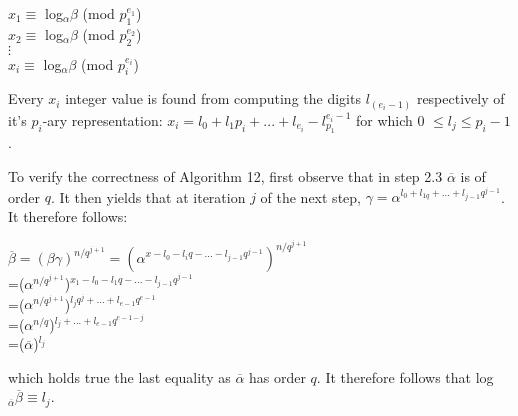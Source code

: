 \documentclass[iwp,first]{luthesis}
\begin{document}
\begin{center}
$x_1 \equiv$ log$_{\alpha}\beta$ (mod $p_{1}^{e_1}$)
\\
$x_2 \equiv$ log$_{\alpha}\beta$ (mod $p_{2}^{e_2}$)
\\
$\vdots$
\\
$x_i \equiv$ log$_{\alpha}\beta$ (mod $p_{i}^{e_i}$)
\end{center}

Every $x_i$ integer value is found from computing the digits $l_(e_{i}-1)$ respectively of it's $p_{i}$-ary representation: $x_{i} = l_{0} + l_{1}p_{i}+...+ l_{e_i} - l_{p_1}^{e_{i}-1}$ for which 0 $\leq l_j \leq p_{i} - 1$.

To verify the correctness of Algorithm 12, first observe that in step 2.3 $\overline{\alpha}$ is of order $q$. It then yields that at iteration $j$ of the next step, $\gamma = \alpha^{l_{0} + l_{1q} + ... + l_{j-1}q^{j-1}}$. It therefore follows:

\begin{center}
$\overline{\beta} = (\beta\gamma)^{n/q^{j+1}} = (\alpha^{x-l_{0}-l_{i}q-...-l_{j-1}q^{j-1}})^{n/q^{j+1}}$
\\
=($\alpha^{n/q^{j+1}}$)$^{x_1-l_0-l_{1}q-...-l_{j-1}q^{j-1}}$
\\
=($\alpha^{n/q^{j+1}}$)$^{l_{j}q^{j}+...+l_{e-1}q^{e-1}}$
\\
=($\alpha^{n/q}$)$^{l_j+...+l_{e-1}q^{e-1-j}}$
\\
=($\overline{\alpha}$)$^{l_j}$
\end{center}

which holds true the last equality as $\overline{\alpha}$ has order $q$. It therefore follows that log$_{\overline{\alpha}}\overline{\beta} \equiv l_j$.
\end{document}
